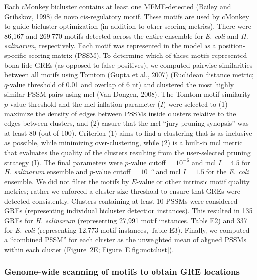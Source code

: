Each cMonkey bicluster contains at least one MEME-detected (Bailey
and Gribskov, 1998) de novo cis-regulatory motif. These motifs are
used by cMonkey to guide bicluster optimization (in addition to other
scoring metrics). There were 86,167 and 269,770 motifs detected across
the entire ensemble for {\it E. coli} and {\it H. salinarum}, respectively. Each
motif was represented in the model as a position-specific scoring
matrix (PSSM). To determine which of these motifs represented bona
fide GREs (as opposed to false positives), we computed pairwise
similarities between all motifs using Tomtom (Gupta et al., 2007)
(Euclidean distance metric; $q$-value threshold of 0.01 and overlap of 6
nt) and clustered the most highly similar PSSM pairs using mcl (Van
Dongen, 2008). The Tomtom motif similarity $p$-value threshold and the
mcl inflation parameter ($I$) were selected to (1) maximize the density
of edges between PSSMs inside clusters relative to the edges between
clusters, and (2) ensure that the mcl “jury pruning synopsis” was at
least 80 (out of 100). Criterion (1) aims to find a clustering that is
as inclusive as possible, while minimizing over-clustering, while (2)
is a built-in mcl metric that evaluates the quality of the clusters
resulting from the user-selected pruning strategy (I). The final
parameters were $p$-value cutoff = $10^{-6}$ and mcl $I = 4.5$ for {\it H. salinarum}
ensemble and $p$-value cutoff = $10^{-5}$ and mcl $I = 1.5$ for the {\it E. coli}
ensemble. We did not filter the motifs by $E$-value or other intrinsic
motif quality metrics; rather we enforced a cluster size threshold to
ensure that GREs were detected consistently. Clusters containing at
least 10 PSSMs were considered GREs (representing individual bicluster
detection instances). This resulted in 135 GREs for {\it H. salinarum}
(representing 27,991 motif instances, Table E2) and 337 for {\it E. coli}
(representing 12,773 motif instances, Table E3). Finally, we computed
a ``combined PSSM'' for each cluster as the unweighted mean of aligned
PSSMs within each cluster (Figure~2E; Figure~E\ref{fig:motclust}).

\subsubsection{Genome-wide scanning of motifs to obtain GRE locations}

